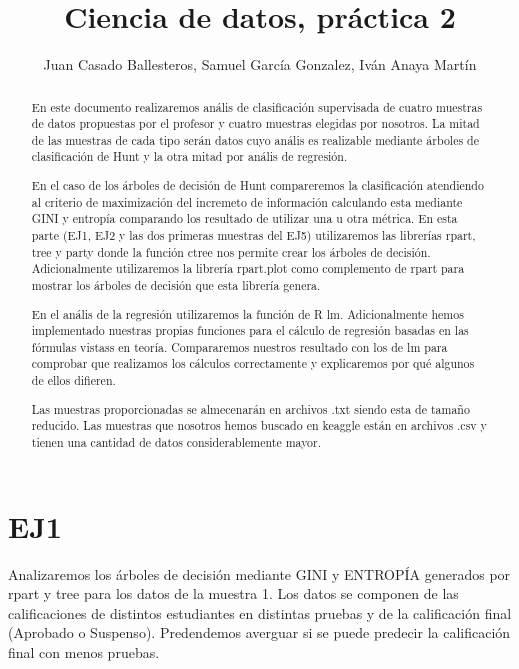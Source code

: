 \documentclass [a4paper] {article}
\title{Ciencia de datos, práctica 2}
\author{Juan Casado Ballesteros, Samuel García Gonzalez, Iván Anaya Martín}
\begin{document}
\maketitle

\begin{abstract}
En este documento realizaremos anális de clasificación supervisada de cuatro muestras de datos propuestas por el profesor y cuatro muestras elegidas por nosotros.
La mitad de las muestras de cada tipo serán datos cuyo anális es realizable mediante árboles de clasificación de Hunt y la otra mitad por anális de regresión.

En el caso de los árboles de decisión de Hunt compareremos la clasificación atendiendo al criterio de maximización del incremeto de información
calculando esta mediante GINI y entropía comparando los resultado de utilizar una u otra métrica.
En esta parte (EJ1, EJ2 y las dos primeras muestras del EJ5) utilizaremos las librerías rpart, tree y party donde la función ctree nos permite crear los árboles de decisión.
Adicionalmente utilizaremos la librería rpart.plot como complemento de rpart para mostrar los árboles de decisión que esta librería genera.

En el anális de la regresión utilizaremos la función de R lm.
Adicionalmente hemos implementado nuestras propias funciones para el cálculo de regresión basadas en las fórmulas vistass en teoría.
Compararemos nuestros resultado con los de lm para comprobar que realizamos los cálculos correctamente y explicaremos por qué algunos de ellos difieren.

Las muestras proporcionadas se almecenarán en archivos .txt siendo esta de tamaño reducido.
Las muestras que nosotros hemos buscado en keaggle están en archivos .csv y tienen una cantidad de datos considerablemente mayor.
\end{abstract}

\newpage
\tableofcontents


\newpage
\section{EJ1}
Analizaremos los árboles de decisión mediante GINI y ENTROPÍA generados por rpart y tree para los datos de la muestra 1.
Los datos se componen de las calificaciones de distintos estudiantes en distintas pruebas y de la calificación final (Aprobado o Suspenso).
Predendemos averguar si se puede predecir la calificación final con menos pruebas.
\end{document}

